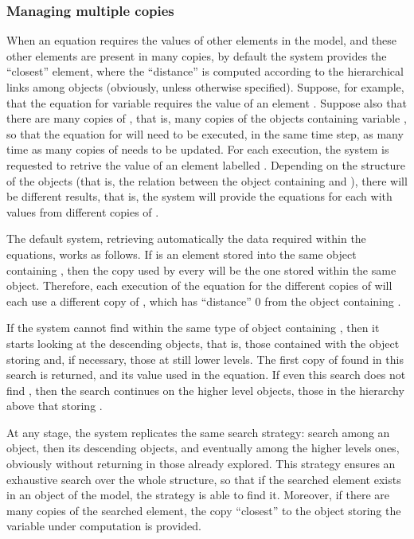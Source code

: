 \documentclass [11pt,a4paper] {book}
\begin{document}
\subsubsection{Managing multiple copies}

When an equation requires the values of other elements in the model, and these other elements are present in many copies, by default the system provides the ``closest'' element, where the ``distance'' is computed according to the hierarchical links among objects (obviously, unless otherwise specified). Suppose, for example, that the equation for variable  requires the value of an element . Suppose also that there are many copies of , that is, many copies of the objects containing variable , so that the equation for  will need to be executed, in the same time step, as many time as many copies of  needs to be updated. For each execution, the system is requested to retrive the value of an element labelled . Depending on the structure of the objects (that is, the relation between the object containing  and ), there will be different results, that is, the system will provide the equations for each  with values from different copies of .  

The default system, retrieving automatically the data required within the equations, works as follows. If  is an element stored into the same object containing , then the copy used by every  will be the one stored within the same object. Therefore, each execution of the equation for the different copies of  will each use a different copy of , which has ``distance'' 0 from the object containing .

If the system cannot find  within the same type of object containing , then it starts looking at the descending objects, that is, those contained with the object storing  and, if necessary, those at still lower levels. The first copy of  found in this search is returned, and its value used in the equation. If even this search does not find , then the search continues on the higher level objects, those in the hierarchy above that storing . 

At any stage, the system replicates the same search strategy: search among an object, then its descending objects, and eventually among the higher levels ones, obviously without returning in those already explored. This strategy ensures an exhaustive search over the whole structure, so that if the searched element exists in an object of the model, the strategy is able to find it. Moreover, if there are many copies of the searched element, the copy ``closest'' to the object storing the variable under computation is provided.
\end{document}
